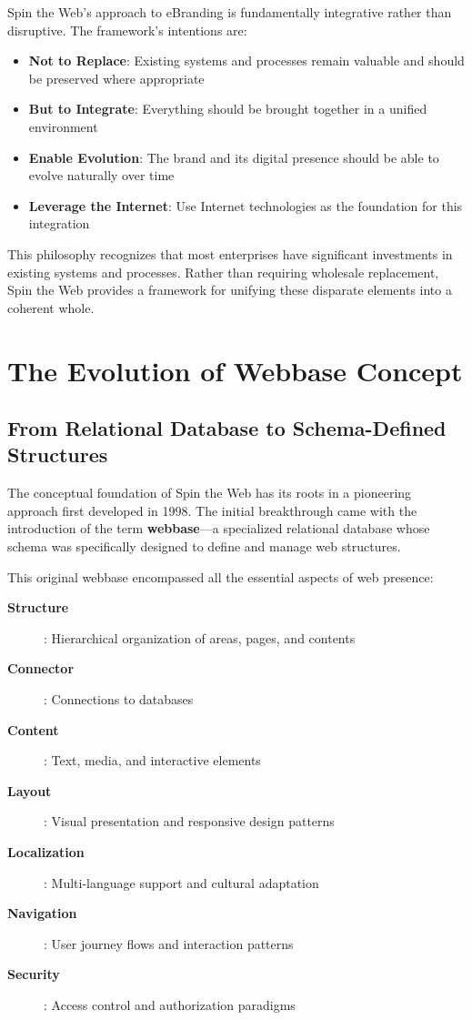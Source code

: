 Spin the Web's approach to eBranding is fundamentally integrative rather than disruptive. The framework's intentions are:

\begin{itemize}
\item \textbf{Not to Replace}: Existing systems and processes remain valuable and should be preserved where appropriate
\item \textbf{But to Integrate}: Everything should be brought together in a unified environment
\item \textbf{Enable Evolution}: The brand and its digital presence should be able to evolve naturally over time
\item \textbf{Leverage the Internet}: Use Internet technologies as the foundation for this integration
\end{itemize}

This philosophy recognizes that most enterprises have significant investments in existing systems and processes. Rather than requiring wholesale replacement, Spin the Web provides a framework for unifying these disparate elements into a coherent whole.

\section{The Evolution of Webbase Concept}

\subsection{From Relational Database to Schema-Defined Structures}

The conceptual foundation of Spin the Web has its roots in a pioneering approach first developed in 1998. The initial breakthrough came with the introduction of the term \textbf{webbase}—a specialized relational database whose schema was specifically designed to define and manage web structures.

This original webbase encompassed all the essential aspects of web presence:

\begin{description}
\item[\textbf{Structure}]: Hierarchical organization of areas, pages, and contents
\item[\textbf{Connector}]: Connections to databases
\item[\textbf{Content}]: Text, media, and interactive elements
\item[\textbf{Layout}]: Visual presentation and responsive design patterns
\item[\textbf{Localization}]: Multi-language support and cultural adaptation
\item[\textbf{Navigation}]: User journey flows and interaction patterns
\item[\textbf{Security}]: Access control and authorization paradigms
\end{description}

